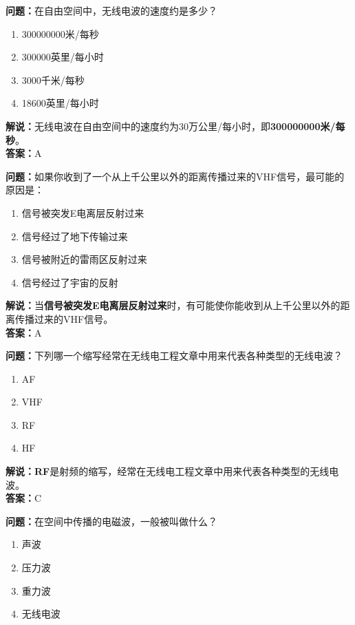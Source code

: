 \textbf{问题：}在自由空间中，无线电波的速度约是多少？

\begin{enumerate}[label=\Alph*), leftmargin=1.5cm]
	\item 300000000米/每秒
	\item 300000英里/每小时
	\item 3000千米/每秒
	\item 18600英里/每小时
\end{enumerate}

\textbf{解说：}无线电波在自由空间中的速度约为30万公里/每小时，即\textbf{300000000米/每秒}。\\\textbf{答案：}A



\textbf{问题：}如果你收到了一个从上千公里以外的距离传播过来的VHF信号，最可能的原因是：

\begin{enumerate}[label=\Alph*), leftmargin=1.5cm]
	\item 信号被突发E电离层反射过来
	\item 信号经过了地下传输过来
	\item 信号被附近的雷雨区反射过来
	\item 信号经过了宇宙的反射
\end{enumerate}

\textbf{解说：}当\textbf{信号被突发E电离层反射过来}时，有可能使你能收到从上千公里以外的距离传播过来的VHF信号。\\\textbf{答案：}A



\textbf{问题：}下列哪一个缩写经常在无线电工程文章中用来代表各种类型的无线电波？

\begin{enumerate}[label=\Alph*), leftmargin=1.5cm]
	\item AF
	\item VHF
	\item RF
	\item HF
\end{enumerate}

\textbf{解说：RF}是射频的缩写，经常在无线电工程文章中用来代表各种类型的无线电波。\\\textbf{答案：}C



\textbf{问题：}在空间中传播的电磁波，一般被叫做什么？

\begin{enumerate}[label=\Alph*), leftmargin=1.5cm]
	\item 声波
	\item 压力波
	\item 重力波
	\item 无线电波
\end{enumerate}

